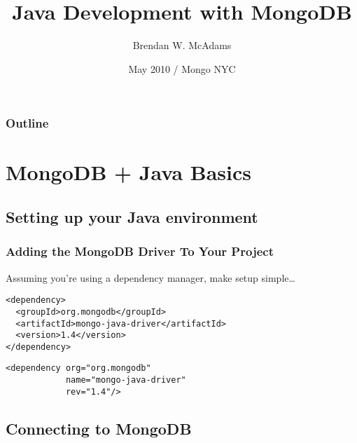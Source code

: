 \documentclass{beamer}
\title[Java Development with MongoDB] %
{Java Development with MongoDB}
\author[Brendan W. McAdams] 
{Brendan W. McAdams}
\institute[Novus Partners, Inc.] %
{ Novus Partners, Inc.\\
  http://novus.com }
\date[Mongo NYC, May 2010] %
{May 2010 / Mongo NYC}
\begin{document}
\begin{frame}
  \titlepage
\end{frame}

\begin{frame}
\frametitle{Outline}
  \tableofcontents
\end{frame}




\section{MongoDB + Java Basics}

\subsection[Getting Started]{Setting up your Java environment}

\begin{frame}[fragile]
\frametitle{Adding the MongoDB Driver To Your Project}
  Assuming you're using a dependency manager, make setup simple\dots
  \pause
\begin{lstlisting}[caption=Maven Dependency]
<dependency>
  <groupId>org.mongodb</groupId>
  <artifactId>mongo-java-driver</artifactId>
  <version>1.4</version>
</dependency>
\end{lstlisting}

\begin{lstlisting}[caption=Ivy Dependency]
<dependency org="org.mongodb" 
            name="mongo-java-driver" 
            rev="1.4"/>
\end{lstlisting}
\end{frame}

\subsection[Connecting to MongoDB]{Connecting to MongoDB}
\end{document}
